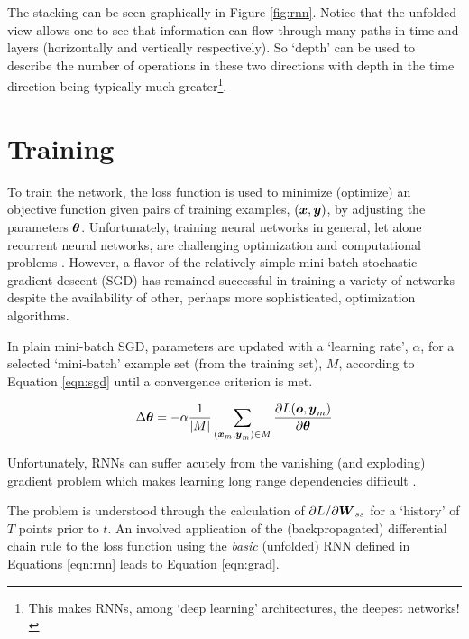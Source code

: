 The stacking can be seen graphically in Figure \ref{fig:rnn}. Notice that the unfolded view allows one to see that information can flow through many paths in time and layers (horizontally and vertically respectively). So `depth' can be used to describe the number of operations in these two directions with depth in the time direction being typically much greater\footnote{This makes RNNs, among `deep learning' architectures, the deepest networks!}.


\section{Training}


To train the network, the loss function is used to  minimize (optimize) an objective function given pairs of training examples, $(\boldsymbol{x},\boldsymbol{y})$, by adjusting the parameters $\boldsymbol{\theta}$. Unfortunately, training neural networks in general, let alone recurrent neural networks, are challenging optimization and computational problems \cite{Blum1992}. However, a flavor of the relatively simple mini-batch stochastic gradient descent (SGD) has remained successful in training a variety of networks \cite{Bengio2012b} despite the availability of other, perhaps more sophisticated, optimization algorithms. %

In plain mini-batch SGD, parameters are updated with a `learning rate', $\alpha$, for a selected `mini-batch' example set (from the training set), $M$, according to Equation \ref{eqn:sgd} until a convergence criterion is met.

\begin{equation}
  \label{eqn:sgd}
   \Delta \vc{\theta} =
   -\alpha
   \frac{1}{|M|} \sum_{(\vc{x}_m,\vc{y}_m) \in M}
   \frac{\partial{L}(
     \vc{o}%
     ,\vc{y}_m)}
   {\partial{\vc{\theta}}}
\end{equation}

Unfortunately, RNNs can suffer acutely from the vanishing (and exploding) gradient problem which makes learning long range dependencies difficult \cite{Hochreiter,Bengio1994,Doya1992,Pascanu2013c}.

The problem is understood through the calculation of $\partial{L}/\partial{\ensuremath{\boldsymbol{W}}_{ss}}$ for a `history' of $T$ points prior to $t$.
%
An involved application of the (backpropagated) differential chain rule to the loss function using the \emph{basic} (unfolded) RNN defined in Equations \ref{eqn:rnn} leads to Equation \ref{eqn:grad}.

